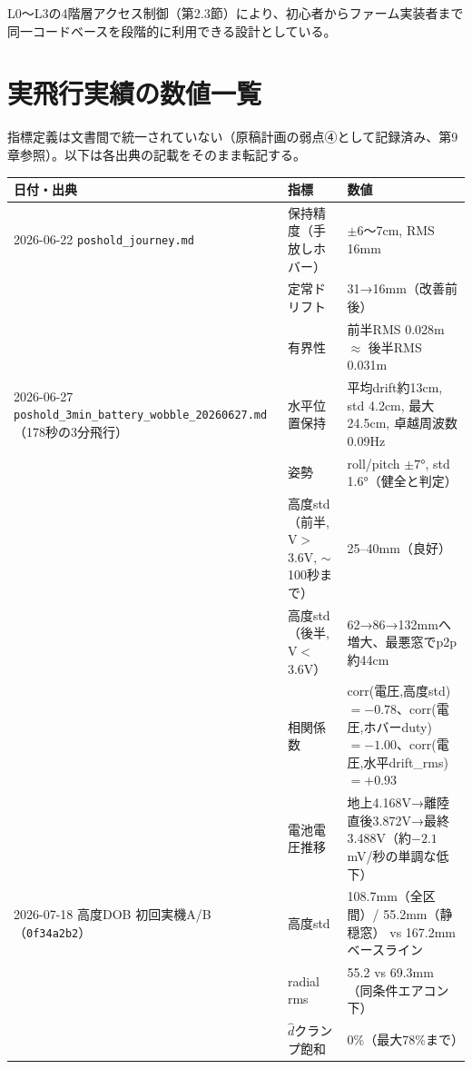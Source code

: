\documentclass[a4paper,10pt]{ltjsarticle}
\begin{document}
L0〜L3の4階層アクセス制御（第2.3節）により、初心者からファーム実装者まで同一コードベースを段階的に利用できる設計としている。

\section{実飛行実績の数値一覧}

指標定義は文書間で統一されていない（原稿計画の弱点④として記録済み、第9章参照）。以下は各出典の記載をそのまま転記する。

{\footnotesize
\begin{longtable}{@{}p{3.6cm}p{3.4cm}p{7.6cm}@{}}
\toprule
日付・出典 & 指標 & 数値 \\
\midrule
\endhead
2026-06-22 \newline\texttt{poshold\_journey.md} & 保持精度（手放しホバー） & $\pm6$〜7cm, RMS 16mm \\
 & 定常ドリフト & 31→16mm（改善前後） \\
 & 有界性 & 前半RMS 0.028m $\approx$ 後半RMS 0.031m \\
\midrule
2026-06-27 \newline\texttt{poshold\_3min\_battery\_\allowbreak wobble\_20260627.md}（178秒の3分飛行） & 水平位置保持 & 平均drift約13cm, std 4.2cm, 最大24.5cm, 卓越周波数0.09Hz \\
 & 姿勢 & roll/pitch $\pm7°$, std 1.6°（健全と判定） \\
 & 高度std（前半, V$>$3.6V, $\sim$100秒まで） & 25--40mm（良好） \\
 & 高度std（後半, V$<$3.6V） & 62→86→132mmへ増大、最悪窓でp2p約44cm \\
 & 相関係数 & corr(電圧,高度std)$=-0.78$、corr(電圧,ホバーduty)$=-1.00$、corr(電圧,水平drift\_rms)$=+0.93$ \\
 & 電池電圧推移 & 地上4.168V→離陸直後3.872V→最終3.488V（約$-2.1$mV/秒の単調な低下） \\
\midrule
2026-07-18 高度DOB \newline 初回実機A/B\newline（\texttt{0f34a2b2}） & 高度std & 108.7mm（全区間）/ 55.2mm（静穏窓） vs 167.2mmベースライン \\
 & radial rms & 55.2 vs 69.3mm（同条件エアコン下） \\
 & $\hat{d}$クランプ飽和 & 0\%（最大78\%まで） \\
\bottomrule
\end{longtable}
}
\end{document}
